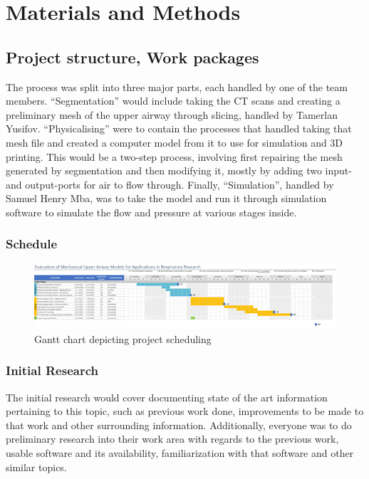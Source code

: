 \documentclass[MME,Projekt,english]{twbook}%
\begin{document}
\chapter{Materials and Methods}

\section{Project structure, Work packages}

The process was split into three major parts, each handled by one of the team members. “Segmentation” would include taking the CT scans and creating a preliminary mesh of the upper airway through slicing, handled by Tamerlan Yusifov. “Physicalising” were to contain the processes that handled taking that mesh file and created a computer model from it to use for simulation and 3D printing. This would be a two-step process, involving first repairing the mesh generated by segmentation and then modifying it, mostly by adding two input- and output-ports for air to flow through. Finally, “Simulation”, handled by Samuel Henry Mba, was to take the model and run it through simulation software to simulate the flow and pressure at various stages inside.

\subsection{Schedule}

\begin{figure}[!htbp]
	\centering
	\includegraphics[width=1.0\linewidth]{images/schedule}
	\caption{Gantt chart depicting project scheduling}\label{schedule}
\end{figure}

\subsection{Initial Research}

The initial research would cover documenting state of the art information pertaining to this topic, such as previous work done, improvements to be made to that work and other surrounding information. Additionally, everyone was to do preliminary research into their work area with regards to the previous work, usable software and its availability, familiarization with that software and other similar topics.
\end{document}
